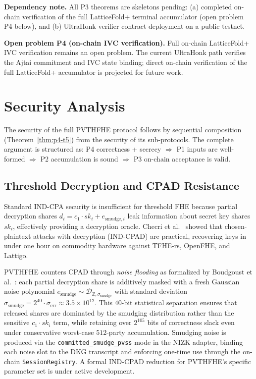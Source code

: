 \documentclass{llncs}
\begin{document}
\textbf{Dependency note.}  All P3 theorems are skeletons pending:
(a) completed on-chain verification of the full LatticeFold+ terminal
accumulator (open problem P4 below), and
(b) UltraHonk verifier contract deployment on a public testnet.

\textbf{Open problem P4 (on-chain IVC verification).}  Full on-chain
LatticeFold+ IVC verification remains an open problem.  The current
UltraHonk path verifies the Ajtai commitment and IVC state binding;
direct on-chain verification of the full LatticeFold+ accumulator is
projected for future work.

\section{Security Analysis}

The security of the full PVTHFHE protocol follows by sequential composition (Theorem~\ref{thm:p4-t5})
from the security of its sub-protocols. The complete argument is structured as:
P4 correctness + secrecy $\Rightarrow$ P1 inputs are well-formed $\Rightarrow$ P2 accumulation
is sound $\Rightarrow$ P3 on-chain acceptance is valid.

\subsection{Threshold Decryption and CPAD Resistance}

Standard IND-CPA security is insufficient for threshold FHE because partial decryption
shares $d_i = c_1 \cdot sk_i + e_{\text{smudge},i}$ leak information about secret key
shares $sk_i$, effectively providing a decryption oracle. Checri et
al.\ \cite{checri2024cpad} showed that chosen-plaintext attacks with decryption
(IND-CPAD) are practical, recovering keys in under one hour on commodity hardware
against TFHE-rs, OpenFHE, and Lattigo.

PVTHFHE counters CPAD through \emph{noise flooding} as formalized by Boudgoust et
al.\ \cite{boudgoust2023threshold}: each partial decryption share is additively masked
with a fresh Gaussian noise polynomial $e_{\text{smudge}} \sim \mathcal{D}_{\mathbb{Z},
\sigma_{\text{smudge}}}$ with standard deviation $\sigma_{\text{smudge}} = 2^{40}
\cdot \sigma_{\text{err}} \approx 3.5 \times 10^{12}$. This $40$-bit statistical
separation ensures that released shares are dominated by the smudging distribution
rather than the sensitive $c_1 \cdot sk_i$ term, while retaining over $2^{105}$ bits
of correctness slack even under conservative worst-case $512$-party accumulation.
Smudging noise is produced via the \texttt{committed\_smudge\_pvss} mode in the NIZK
adapter, binding each noise slot to the DKG transcript and enforcing one-time use
through the on-chain \texttt{SessionRegistry}. A formal IND-CPAD reduction for
PVTHFHE's specific parameter set is under active development.
\end{document}
